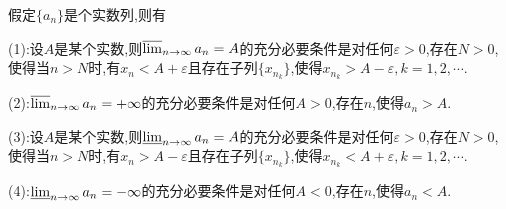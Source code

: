 \documentclass[../../main.tex]{subfiles}%
\begin{document}
\begin{proposition}[上下极限的等价定义]\label{proposition:上下极限的等价定义}
假定\(\{a_n\}\)是个实数列,则有

(1):设\(A\)是某个实数,则\(\varlimsup_{n \to \infty} a_n = A\)的充分必要条件是对任何\(\varepsilon > 0\),存在$N>0$,使得当$n>N$时,有$x_n<A+\varepsilon$且存在子列$\{x_{n_k}\}$,使得$x_{n_k}>A-\varepsilon,k=1,2,\cdots$.

(2):\(\varlimsup_{n \to \infty} a_n = +\infty\)的充分必要条件是对任何\(A > 0\),存在\(n\),使得\(a_n > A\).

(3):设\(A\)是某个实数,则\(\varliminf_{n \to \infty} a_n = A\)的充分必要条件是对任何\(\varepsilon > 0\),存在$N>0$,使得当$n>N$时,有$x_n>A-\varepsilon$且存在子列$\{x_{n_k}\}$,使得$x_{n_k}<A+\varepsilon,k=1,2,\cdots$.

(4):\(\varliminf_{n \to \infty} a_n = -\infty\)的充分必要条件是对任何\(A < 0\),存在\(n\),使得\(a_n < A\).
\end{proposition}
\end{document}
